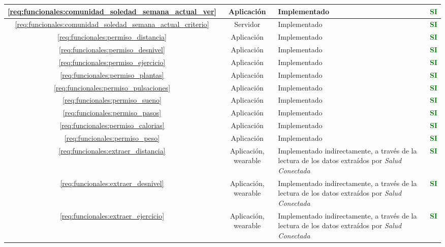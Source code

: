 \begin{xltabular}{\textwidth}{|c|c|X|c|}
        \ref{req:funcionales:comunidad_soledad_semana_actual_ver} & Aplicación & Implementado & \textcolor{green}{\textbf{SI}} \\
        \hline
        \ref{req:funcionales:comunidad_soledad_semana_actual_criterio} & Servidor & Implementado & \textcolor{green}{\textbf{SI}} \\
        \hline
        \ref{req:funcionales:permiso_distancia} & Aplicación & Implementado & \textcolor{green}{\textbf{SI}} \\
        \hline
        \ref{req:funcionales:permiso_desnivel} & Aplicación & Implementado & \textcolor{green}{\textbf{SI}} \\
        \hline
        \ref{req:funcionales:permiso_ejercicio} & Aplicación & Implementado & \textcolor{green}{\textbf{SI}} \\
        \hline
        \ref{req:funcionales:permiso_plantas} & Aplicación & Implementado & \textcolor{green}{\textbf{SI}} \\
        \hline
        \ref{req:funcionales:permiso_pulsaciones} & Aplicación & Implementado & \textcolor{green}{\textbf{SI}} \\
        \hline
        \ref{req:funcionales:permiso_sueno} & Aplicación & Implementado & \textcolor{green}{\textbf{SI}} \\
        \hline
        \ref{req:funcionales:permiso_pasos} & Aplicación & Implementado & \textcolor{green}{\textbf{SI}} \\
        \hline
        \ref{req:funcionales:permiso_calorias} & Aplicación & Implementado & \textcolor{green}{\textbf{SI}} \\
        \hline
        \ref{req:funcionales:permiso_peso} & Aplicación & Implementado & \textcolor{green}{\textbf{SI}} \\
        \hline
        \ref{req:funcionales:extraer_distancia} & Aplicación, \gls{wearable} & Implementado indirectamente, a través de la lectura de los datos extraídos por \textit{Salud Conectada} & \textcolor{green}{\textbf{SI}} \\
        \hline
        \ref{req:funcionales:extraer_desnivel} & Aplicación, \gls{wearable} & Implementado indirectamente, a través de la lectura de los datos extraídos por \textit{Salud Conectada} & \textcolor{green}{\textbf{SI}} \\
        \hline
        \ref{req:funcionales:extraer_ejercicio} & Aplicación, \gls{wearable} & Implementado indirectamente, a través de la lectura de los datos extraídos por \textit{Salud Conectada} & \textcolor{green}{\textbf{SI}} \\

\end{xltabular}
